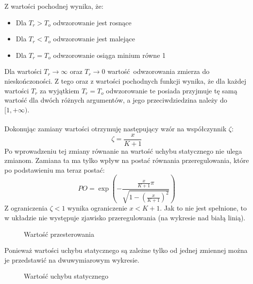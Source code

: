 \documentclass[a4paper, 12pt]{article}
\begin{document}
            Z wartości pochodnej wynika, że:
            \begin{itemize}
                \item Dla $T_r > T_o$ odwzorowanie jest rosnące
                \item Dla $T_r < T_o$ odwzorowanie jest malejące
                \item Dla $T_r = T_o$ odwzorowanie osiąga minium równe 1
            \end{itemize}
            Dla wartości $T_r \to \infty$ oraz $T_r \to 0$ wartość odwzorowania zmierza do 
            nieskończoności.  Z tego oraz z wartości pochodnych funkcji wynika, że dla każdej 
            wartości $T_r$ za wyjątkiem $T_r = T_o$ odwzorowanie te posiada przyjmuje tę samą 
            wartość dla dwóch różnych argumentów, a jego przeciwdziedzina należy do $[1, +\infty)$.
            \\ \\
            Dokonując zamiany wartości otrzymuję następujący wzór na współczynnik $\zeta$:
            \begin{equation}
                \zeta = \frac{x}{K+1}
            \end{equation}
            Po wprowadzeniu tej zmiany równanie na wartość uchybu statycznego nie ulega zmianom. Zamiana
            ta ma tylko wpływ na postać równania przeregulowania, które po podstawieniu ma teraz postać:
            \begin{equation}
                PO = \exp\left(
                    - \frac{\frac{x}{K+1} \pi}{\sqrt{1 - \left(\frac{x}{K+1}\right)^2}}
                \right)
                \label{eq:overshoot2}
            \end{equation}
            Z ograniczenia $\zeta < 1$ wynika ograniczenie $x < K + 1$. Jak to nie jest spełnione, 
            to w układzie nie występuje zjawisko przeregulowania (na wykresie nad białą linią).
            \begin{figure}[H]
                \centering
                \def \svgwidth{0.7\columnwidth}
                
                \caption{Wartość przesterowania}
            \end{figure}\noindent
            Ponieważ wartości uchybu statycznego są zależne tylko od jednej zmiennej można je
            przedstawić na dwuwymiarowym wykresie.
            \begin{figure}[H]
                \centering
                \def \svgwidth{0.7\columnwidth}
                
                \caption{Wartość uchybu statycznego}
            \end{figure}\noindent
\end{document}
